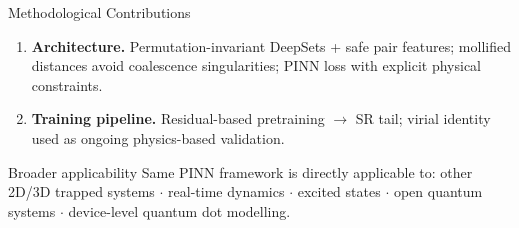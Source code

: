 \documentclass[aspectratio=169,10pt]{beamer}
\begin{document}
\begin{frame}{Methodological Contributions}
  \begin{enumerate}\itemsep5pt
    \item \textbf{Architecture.}
          Permutation-invariant DeepSets + safe pair features; mollified
          distances avoid coalescence singularities; PINN loss with explicit
          physical constraints.

    \item \textbf{Training pipeline.}
          Residual-based pretraining $\to$ SR tail; virial identity used as
          ongoing physics-based validation.

  \end{enumerate}

  \vspace{0.3cm}
  \begin{alertblock}{Broader applicability}
    Same PINN framework is directly applicable to:
    other 2D/3D trapped systems $\cdot$ real-time dynamics $\cdot$
    excited states $\cdot$ open quantum systems $\cdot$
    device-level quantum dot modelling.
  \end{alertblock}
\end{frame}
\end{document}
